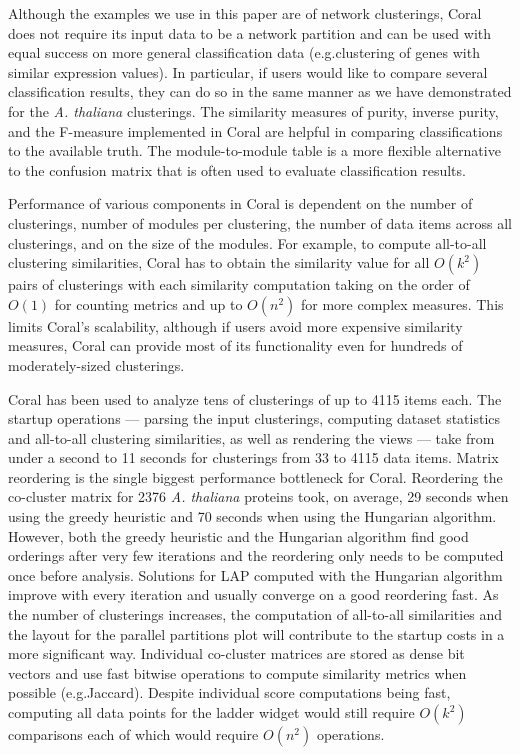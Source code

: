 \documentclass[12pt]{cmuthesis}
\newcommand\Coral{Coral\xspace}
\newcommand{\Athal}{\textit{A. thaliana}\xspace}
\begin{document}
  Although the examples we use in this paper are of network clusterings, \Coral does not require its input data to be a network partition and can be used with equal success on more general classification data (e.g.\@ clustering of genes with similar expression values). In particular, if users would like to compare several classification results, they can do so in the same manner as we have demonstrated for the \Athal clusterings. The similarity measures of purity, inverse purity, and the F-measure implemented in \Coral are helpful in comparing classifications to the available truth. The module-to-module table is a more flexible alternative to the confusion matrix that is often used to evaluate classification results.

  Performance of various components in \Coral is dependent on the number of clusterings, number of modules per clustering, the number of data items across all clusterings, and on the size of the modules. For example, to compute all-to-all clustering similarities, Coral has to obtain the similarity value for all $O(k^2)$ pairs of clusterings with each similarity computation taking on the order of $O(1)$ for counting metrics and up to $O(n^2)$ for more complex measures. This limits \Coral's scalability, although if users avoid more expensive similarity measures, \Coral can provide most of its functionality even for hundreds of moderately-sized clusterings. 

  \Coral has been used to analyze tens of clusterings of up to 4115 items each. The startup operations --- parsing the input clusterings, computing dataset statistics and all-to-all clustering similarities, as well as rendering the views --- take from under a second to 11 seconds for clusterings from 33 to 4115 data items. Matrix reordering is the single biggest performance bottleneck for \Coral. Reordering the co-cluster matrix for 2376 \Athal proteins took, on average, 29 seconds when using the greedy heuristic and 70 seconds when using the Hungarian algorithm. However, both the greedy heuristic and the Hungarian algorithm find good orderings after very few iterations and the reordering only needs to be computed once before analysis. Solutions for LAP computed with the Hungarian algorithm improve with every iteration and usually converge on a good reordering fast. As the number of clusterings increases, the computation of all-to-all similarities and the layout for the parallel partitions plot will contribute to the startup costs in a more significant way. Individual co-cluster matrices are stored as dense bit vectors and use fast bitwise operations to compute similarity metrics when possible (e.g.\@ Jaccard). Despite individual score computations being fast, computing all data points for the ladder widget would still require $O(k^2)$ comparisons each of which would require $O(n^2)$ operations.
\end{document}

